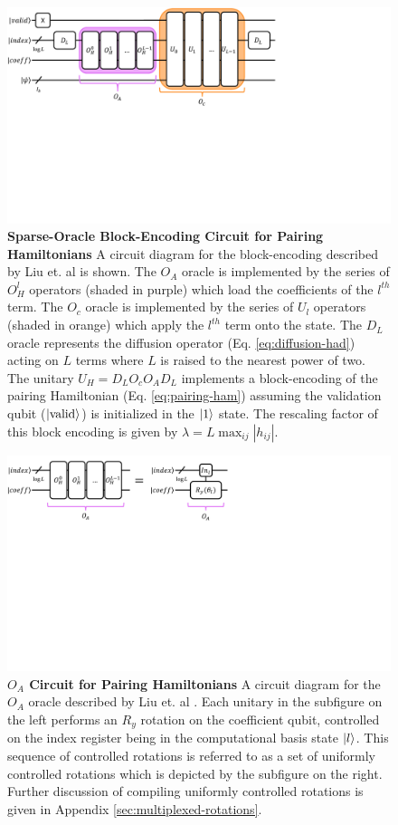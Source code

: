 \begin{figure}[h]
    \includegraphics[width=12cm]{figures/liu-construction.pdf}
    \caption{
        \textbf{Sparse-Oracle Block-Encoding Circuit for Pairing Hamiltonians}
        A circuit diagram for the block-encoding described by Liu et. al \cite{liu2024efficient} is shown.
        The $O_A$ oracle is implemented by the series of $O_H^l$ operators (shaded in purple) which load the coefficients of the $l^{th}$ term.
        The $O_c$ oracle is implemented by the series of $U_l$ operators (shaded in orange) which apply the $l^{th}$ term onto the state.
        The $D_L$ oracle represents the diffusion operator (Eq. \ref{eq:diffusion-had}) acting on $L$ terms where $L$ is raised to the nearest power of two.
        The unitary $U_H = D_L O_c O_A D_L$ implements a block-encoding of the pairing Hamiltonian (Eq. \ref{eq:pairing-ham}) assuming the validation qubit ($\ket{\text{valid}}$) is initialized in the $\ket{1}$ state.
        The rescaling factor of this block encoding is given by $\lambda = L \max_{ij} {|h_{ij}|}$.
    }
    \label{fig:liu-construction}
\end{figure}

\begin{figure}[h]
    \includegraphics[width=12cm]{figures/liu-O_A.pdf}
    \caption{
        \textbf{$O_A$ Circuit for Pairing Hamiltonians}
        A circuit diagram for the $O_A$ oracle described by Liu et. al \cite{liu2024efficient}.
        Each unitary in the subfigure on the left performs an $R_y$ rotation on the coefficient qubit, controlled on the index register being in the computational basis state $\ket{l}$.
        This sequence of controlled rotations is referred to as a set of uniformly controlled rotations which is depicted by the subfigure on the right.
        Further discussion of compiling uniformly controlled rotations is given in Appendix \ref{sec:multiplexed-rotations}.
    }
    \label{fig:liu-O_A}
\end{figure}

